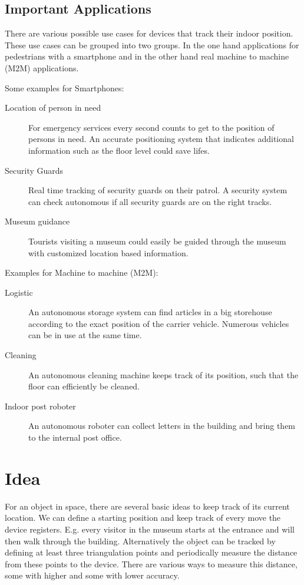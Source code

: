 
\subsection{Important Applications}
There are various possible use cases for devices that track their indoor position. These use cases can be grouped into two groups. In the one hand applications for pedestrians with a smartphone and in the other hand real machine to machine (M2M) applications. 

Some examples for Smartphones:
\begin{description}
\item [Location of person in need] For emergency services every second counts to get to the position of persons in need. An accurate positioning system that indicates additional information such as the floor level could save lifes.
\item [Security Guards] Real time tracking of security guards on their patrol. A security system can check autonomous if all security guards are on the right tracks.
\item [Museum guidance] Tourists visiting a museum could easily be guided through the museum with customized location based information.
\end{description}

Examples for Machine to machine (M2M):
\begin{description}
\item [Logistic] An autonomous storage system can find articles in a big storehouse according to the exact position of the carrier vehicle. Numerous vehicles can be in use at the same time.
\item [Cleaning] An autonomous cleaning machine keeps track of its position, such that the floor can efficiently be cleaned.
\item [Indoor post roboter] An autonomous roboter can collect letters in the building and bring them to the internal post office.
\end{description}



\section{Idea}
For an object in space, there are several basic ideas to keep track of its current location. We can define a starting position and keep track of every move the device registers. E.g. every visitor in the museum starts at the entrance and will then walk through the building.
Alternatively the object can be tracked by defining at least three triangulation points and periodically measure the distance from these points to the device. There are various ways to measure this distance, some with higher and some with lower accuracy.

